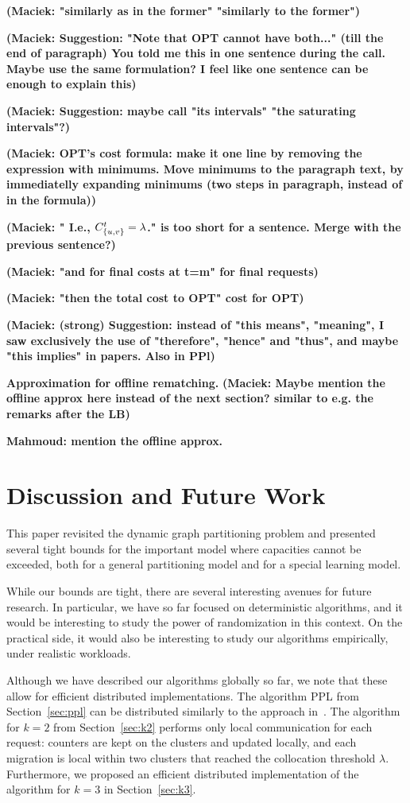\documentclass[a4paper,anonymous,USenglish]{lipics-v2019}
\newcommand{\OPT}{\textsc{OPT}\xspace}
\DeclarePairedDelimiter\set{\{}{\}}
\newcommand\mahmoud[1]{\color{orange}\textbf{Mahmoud: #1~}\color{black}}
\newcommand\maciek[1]{\color{brown}\textbf{(Maciek: #1)}\color{black}}
\begin{document}
\maciek{"similarly as in the former" "\textbf{similarly to the former}"}


\maciek{Suggestion: "Note that \OPT cannot have both..." (till the end of paragraph) You told me this in one sentence during the call. Maybe use the same formulation? I feel like one sentence can be enough to explain this}

\maciek{Suggestion: maybe call "its intervals" "\textbf{the saturating intervals}"?}

\maciek{OPT's cost formula: make it one line by removing the expression with minimums. Move minimums to the paragraph text, by immediatelly expanding minimums (two steps in paragraph, instead of in the formula)}

\maciek{"	I.e., $ C^t_{\set{u,v}} = \lambda$." is too short for a sentence. Merge with the previous sentence?}

\maciek{"and for final costs at t=m" for final requests}

\maciek{"then the total cost to OPT" cost for OPT}

\maciek{(strong) Suggestion: instead of "this means", "meaning", I saw exclusively the use of "therefore", "hence" and "thus", and maybe "this implies" in papers. Also in PPl}

\noindent
\textbf{Approximation for offline rematching.}
\maciek{Maybe mention the offline approx here instead of the next section? similar to e.g. the remarks after the LB}

\mahmoud{mention the offline approx.}

\section{Discussion and Future Work}

This paper revisited the dynamic graph partitioning problem and presented several tight bounds for the important model where capacities cannot be exceeded, both for a general partitioning model and for a special learning model. 

While our bounds are tight, there are several interesting avenues for future research.
In particular, we have so far focused on deterministic algorithms, and it would be interesting to study the power of randomization in this context.
On the practical side, it would also be interesting to study our algorithms empirically, under realistic workloads.

Although we have described our algorithms globally so far, we note that these allow for efficient distributed implementations. 
The algorithm PPL from Section~\ref{sec:ppl} can be distributed
similarly to the approach in~\cite{sigmetrics19_partitioning}.
The algorithm for $k=2$ from Section~\ref{sec:k2} performs only local communication for each request: counters are kept on the clusters and updated locally, and each migration is local within two clusters that reached the collocation threshold $\lambda$.
Furthermore, we proposed an efficient distributed implementation of the algorithm for $k=3$ in Section~\ref{sec:k3}.
\end{document}

